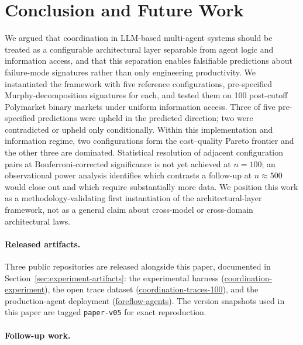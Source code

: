 \documentclass[11pt]{article}
\begin{document}
\section{Conclusion and Future Work}
\label{sec:conclusion}

We argued that coordination in LLM-based multi-agent systems should be treated as a configurable architectural layer separable from agent logic and information access, and that this separation enables falsifiable predictions about failure-mode signatures rather than only engineering productivity. We instantiated the framework with five reference configurations, pre-specified Murphy-decomposition signatures for each, and tested them on 100 post-cutoff Polymarket binary markets under uniform information access. Three of five pre-specified predictions were upheld in the predicted direction; two were contradicted or upheld only conditionally. Within this implementation and information regime, two configurations form the cost--quality Pareto frontier and the other three are dominated. Statistical resolution of adjacent configuration pairs at Bonferroni-corrected significance is not yet achieved at $n=100$; an observational power analysis identifies which contrasts a follow-up at $n \approx 500$ would close out and which require substantially more data. We position this work as a methodology-validating first instantiation of the architectural-layer framework, not as a general claim about cross-model or cross-domain architectural laws.

\paragraph{Released artifacts.}
Three public repositories are released alongside this paper, documented in Section~\ref{sec:experiment-artifacts}: the experimental harness (\href{https://github.com/ForesightFlow/coordination-experiment}{coordination-experiment}), the open trace dataset (\href{https://github.com/ForesightFlow/datasets}{coordination-traces-100}), and the production-agent deployment (\href{https://github.com/ForesightFlow/foreflow-agents}{foreflow-agents}). The version snapshots used in this paper are tagged \texttt{paper-v05} for exact reproduction.

\paragraph{Follow-up work.}
\end{document}

